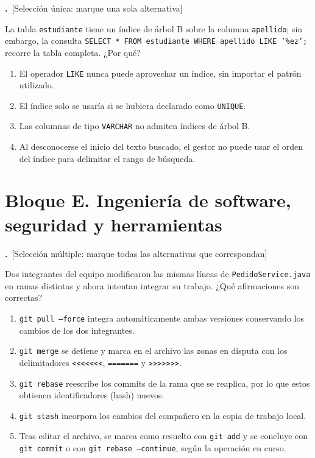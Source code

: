 \documentclass[11pt,a4paper]{article}
\newif\ifclave
\newcounter{preg}
\newcommand{\tipounica}{\textcolor{uteqMid}{\small\textsf{[Selección única: marque una sola alternativa]}}}
\newcommand{\tipomultiple}{\textcolor{uteqAmber!80!black}{\small\textsf{[Selección múltiple: marque todas las alternativas que correspondan]}}}
\newcommand{\pregunta}[2]{%
	\refstepcounter{preg}%
	\par\medskip
	\noindent\textbf{\color{uteqBlue}\arabic{preg}.}~#1\par
	\noindent #2\par\nopagebreak
}
\newcommand{\ok}{\ifclave~\textcolor{uteqGreen}{\ding{51}~\textbf{Correcta}}\fi}
\newenvironment{opciones}{%
	\begin{enumerate}[label={$\square$\ \alph*)},leftmargin=2.6em,itemsep=1pt,topsep=2pt]
}{%
	\end{enumerate}
}
\newcommand{\just}[1]{%
	\ifclave
		\begin{tcolorbox}[colback=uteqGreen!6,colframe=uteqGreen!70!black,boxrule=0.4pt,arc=1mm,left=4pt,right=4pt,top=2pt,bottom=2pt,fontupper=\small]
			\textbf{Justificación:} #1
		\end{tcolorbox}
	\fi
}
\begin{document}
\pregunta{\tipounica}{La tabla \texttt{estudiante} tiene un índice de árbol B sobre la columna \texttt{apellido}; sin embargo, la consulta \texttt{SELECT * FROM estudiante WHERE apellido LIKE '\%ez';} recorre la tabla completa. ¿Por qué?}
\begin{opciones}
	\item El operador \texttt{LIKE} nunca puede aprovechar un índice, sin importar el patrón utilizado.
	\item El índice solo se usaría si se hubiera declarado como \texttt{UNIQUE}.
	\item Las columnas de tipo \texttt{VARCHAR} no admiten índices de árbol B.
	\item Al desconocerse el inicio del texto buscado, el gestor no puede usar el orden del índice para delimitar el rango de búsqueda.\ok
\end{opciones}
\just{El árbol B ordena los valores por su prefijo; un patrón como \texttt{'Gu\%'} sí puede usar el índice, pero un comodín al inicio impide localizar un rango y obliga a revisar todas las filas. Los índices no necesitan ser únicos y los \texttt{VARCHAR} sí son indexables.}

\section*{\color{uteqBlue}\large Bloque E. Ingeniería de software, seguridad y herramientas}

\pregunta{\tipomultiple}{Dos integrantes del equipo modificaron las mismas líneas de \texttt{PedidoService.java} en ramas distintas y ahora intentan integrar su trabajo. ¿Qué afirmaciones son correctas?}
\begin{opciones}
	\item \texttt{git pull --force} integra automáticamente ambas versiones conservando los cambios de los dos integrantes.
	\item \texttt{git merge} se detiene y marca en el archivo las zonas en disputa con los delimitadores \texttt{<{}<{}<{}<{}<{}<{}<}, \texttt{=======} y \texttt{>{}>{}>{}>{}>{}>{}>}.\ok
	\item \texttt{git rebase} reescribe los commits de la rama que se reaplica, por lo que estos obtienen identificadores (hash) nuevos.\ok
	\item \texttt{git stash} incorpora los cambios del compañero en la copia de trabajo local.
	\item Tras editar el archivo, se marca como resuelto con \texttt{git add} y se concluye con \texttt{git commit} o con \texttt{git rebase --continue}, según la operación en curso.\ok
\end{opciones}
\just{\texttt{merge} se detiene ante el conflicto y lo marca; \texttt{rebase} crea commits nuevos con hash distinto; la resolución se registra con \texttt{git add} y se concluye con \texttt{commit} o \texttt{rebase --continue}. \texttt{git pull} no resuelve conflictos automáticamente y \texttt{git stash} guarda temporalmente los cambios propios, no los del compañero.}
\end{document}
